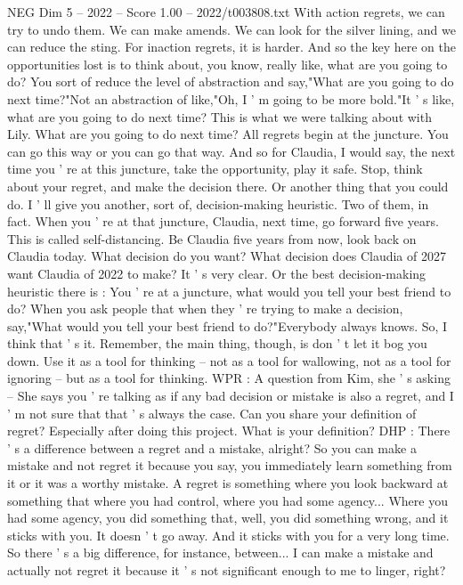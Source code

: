 \begin{textsample}{NEG Dim 5 – 2022 – Score 1.00 – 2022/t003808.txt}
With action regrets, we can try to undo them.
We can make amends.
We can look for the silver lining, and we can reduce the sting.
For inaction regrets, it is harder.
And so the key here on the opportunities lost is to think about, you know, really like, what are you going to do?
You sort of reduce the level of abstraction and say,"What are you going to do next time?"Not an abstraction of like,"Oh, I ' m going to be more bold."It ' s like, what are you going to do next time?
This is what we were talking about with Lily.
What are you going to do next time?
All regrets begin at the juncture.
You can go this way or you can go that way.
And so for Claudia, I would say, the next time you ' re at this juncture, take the opportunity, play it safe.
Stop, think about your regret, and make the decision there.
Or another thing that you could do.
I ' ll give you another, sort of, decision-making heuristic.
Two of them, in fact.
When you ' re at that juncture, Claudia, next time, go forward five years.
This is called self-distancing.
Be Claudia five years from now, look back on Claudia today.
What decision do you want?
What decision does Claudia of 2027 want Claudia of 2022 to make?
It ' s very clear.
Or the best decision-making heuristic there is : You ' re at a juncture, what would you tell your best friend to do?
When you ask people that when they ' re trying to make a decision, say,"What would you tell your best friend to do?"Everybody always knows.
So, I think that ' s it.
Remember, the main thing, though, is don ' t let it bog you down.
Use it as a tool for thinking -- not as a tool for wallowing, not as a tool for ignoring -- but as a tool for thinking.
WPR : A question from Kim, she ' s asking -- She says you ' re talking as if any bad decision or mistake is also a regret, and I ' m not sure that that ' s always the case.
Can you share your definition of regret?
Especially after doing this project.
What is your definition?
DHP : There ' s a difference between a regret and a mistake, alright?
So you can make a mistake and not regret it because you say, you immediately learn something from it or it was a worthy mistake.
A regret is something where you look backward at something that where you had control, where you had some agency...
Where you had some agency, you did something that, well, you did something wrong, and it sticks with you.
It doesn ' t go away.
And it sticks with you for a very long time.
So there ' s a big difference, for instance, between...
I can make a mistake and actually not regret it because it ' s not significant enough to me to linger, right?

\end{textsample}
